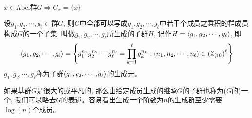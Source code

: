 \begin{exercise}[教材B.5]
    $x\in\text{Abel群$G$}\Longrightarrow G_x=\{x\}$
\end{exercise}
\begin{definition}[生成元]
    设$g_1,g_2,\cdots,g_\ell\in\text{群$G$}$, 则$G$中全部可以写成$g_1,g_2,\cdots,g_\ell$中若干个成员之乘积的群成员构成$G$的一个子集, 叫做$g_1,g_2,\cdots,g_\ell$所生成的子群$H$, 记作$H=\expval{g_1,g_2,\cdots,g_\ell}$, 即
    $$\expval{g_1,g_2,\cdots,g_\ell}=\qty{g_1^{n_1}g_2^{n_2}\cdots g_\ell^{n_\ell}=\prod_{k=1}^\ell g_k^{n_k}:(n_1,n_2,\cdots,n_\ell)\in\qty(\mathbb{Z}_{\geqslant0})^\ell}$$
    $g_1,g_2,\cdots,g_\ell$称为子群$\expval{g_1,g_2,\cdots,g_\ell}$的生成元。
\end{definition}
\par 如果基群$G$是很大的或平凡的, 那么由给定成员生成的继承$G$的子群也称为($G$的)一个, 我们可以略去$G$的表述。容易看出生成一个阶数为$n$的生成群至少需要$\log(n)$个成员。